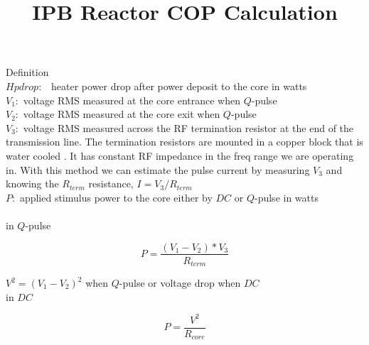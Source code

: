 \documentclass{article}
\title{IPB Reactor COP Calculation}
\begin{document}
\maketitle

Definition\\
$Hpdrop:$ \ heater power drop after power deposit to the core in watts\\
$V_{1}:$ voltage RMS measured at the core entrance when $Q$-pulse\\
$V_{2}:$ voltage RMS measured at the core exit when $Q$-pulse\\
$V_{3}:$ voltage RMS measured across the RF termination resistor at the end of the transmission line. The termination resistors are mounted in a copper block that is water cooled . It has constant RF impedance in the freq range we are operating in. With this method we can estimate the pulse current by measuring $V_{3}$ and knowing the $R_{term}$ resistance, $I = V_{3} / R_{term}$ \\
$P:$ applied stimulus power to the core either by $DC$ or $Q$-pulse in watts\\
\\
in $Q$-pulse 

\begin{equation}
P=\frac{(V_{1}-V_{2})*V_{3}}{R_{term}} \label{1}%
\end{equation}
%

$V^{2}=(V_{1}-V_{2})^{2}$ when $Q$-pulse or voltage drop when $DC$ \\
in $DC$


\begin{equation}
P=\frac{V^{2}}{R_{core}} \label{1}%
\end{equation}
\end{document}
